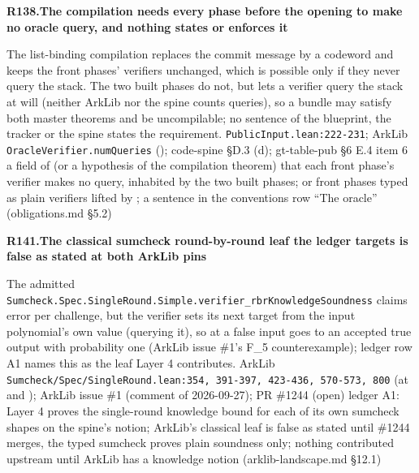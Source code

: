 \par\medskip\noindent\textbf{R138.}\enspace\textbf{The compilation needs every phase before the opening to make no oracle query, and nothing states or enforces it}\par\nopagebreak
{} The list-binding compilation replaces the commit message by a codeword and keeps the front phases' verifiers unchanged, which is possible only if they never query the stack. The two built phases do not, but  lets a verifier query the stack at will (neither ArkLib nor the spine counts queries), so a bundle may satisfy both master theorems and be uncompilable; no sentence of the blueprint, the tracker or the spine states the requirement.
 \texttt{Public\allowbreak{}Input.\allowbreak{}lean:\allowbreak{}222-\allowbreak{}231}; ArkLib \texttt{Oracle\allowbreak{}Verifier.\allowbreak{}num\allowbreak{}Queries} (); code-spine §D.3 (d); gt-table-pub §6 E.4 item 6
 a field of  (or a hypothesis of the compilation theorem) that each front phase's verifier makes no query, inhabited by the two built phases; or front phases typed as plain verifiers lifted by ; a sentence in the conventions row ``The oracle'' (obligations.md §5.2)

\par\medskip\noindent\textbf{R141.}\enspace\textbf{The classical sumcheck round-by-round leaf the ledger targets is false as stated at both ArkLib pins}\par\nopagebreak
{} The admitted \texttt{Sumcheck.\allowbreak{}Spec.\allowbreak{}Single\allowbreak{}Round.\allowbreak{}Simple.\allowbreak{}verifier\_\allowbreak{}rbr\allowbreak{}Knowledge\allowbreak{}Soundness} claims error  per challenge, but the verifier sets its next target from the input polynomial's own value (querying it), so at  a false input goes to an accepted true output with probability one (ArkLib issue \#1's F\_5 counterexample); ledger row A1 names this as the leaf Layer 4 contributes.
 ArkLib \texttt{Sumcheck/\allowbreak{}Spec/\allowbreak{}Single\allowbreak{}Round.\allowbreak{}lean:\allowbreak{}354,\allowbreak{} 391-\allowbreak{}397,\allowbreak{} 423-\allowbreak{}436,\allowbreak{} 570-\allowbreak{}573,\allowbreak{} 800} (at  and ); ArkLib issue \#1 (comment of 2026-09-27); PR \#1244 (open)
 ledger A1: Layer 4 proves the single-round knowledge bound for each of its own sumcheck shapes on the spine's notion; ArkLib's classical leaf is false as stated until \#1244 merges, the typed sumcheck proves plain soundness only; nothing contributed upstream until ArkLib has a knowledge notion (arklib-landscape.md §12.1)


